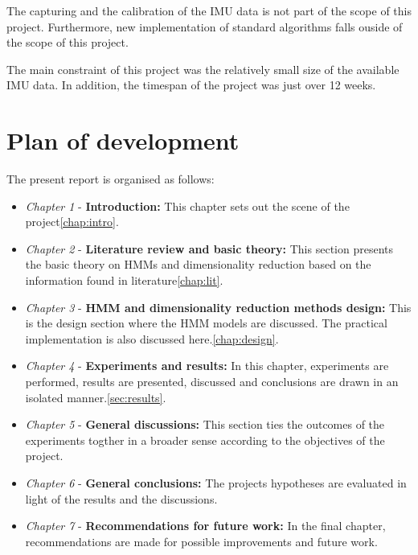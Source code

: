 The capturing and the calibration of the IMU data is not part of the scope of this project. Furthermore, new implementation of standard algorithms falls ouside of the scope of this project. 

The main constraint of this project was the relatively small size of the available IMU data. In addition, the timespan of the project was just over 12 weeks.
\section{Plan of development}
The present report is organised as follows:
\begin{itemize}
	\item \textit{Chapter 1} - \textbf{Introduction:} This chapter sets out the scene of the project\ref{chap:intro}. 
	\item \textit{Chapter 2} - \textbf{Literature review and basic theory:} This section presents the basic theory on HMMs and dimensionality reduction based on the information found in literature\ref{chap:lit}.
	\item \textit{Chapter 3} - \textbf{HMM and dimensionality reduction methods design:} This is the design section where the HMM models are discussed. The practical implementation is also discussed here.\ref{chap:design}.
	\item \textit{Chapter 4} - \textbf{Experiments and results:} In this chapter, experiments are performed, results are presented, discussed and conclusions are drawn in an isolated manner.\ref{sec:results}.
	\item \textit{Chapter 5} - \textbf{General discussions:} This section ties the outcomes of the experiments togther in a broader sense according to the objectives of the project.
	\item \textit{Chapter 6} - \textbf{General conclusions:} The projects hypotheses are evaluated in light of the results and the discussions.
	\item \textit{Chapter 7} - \textbf{Recommendations for future work:} In the final chapter, recommendations are made for possible improvements and future work.
\end{itemize}
